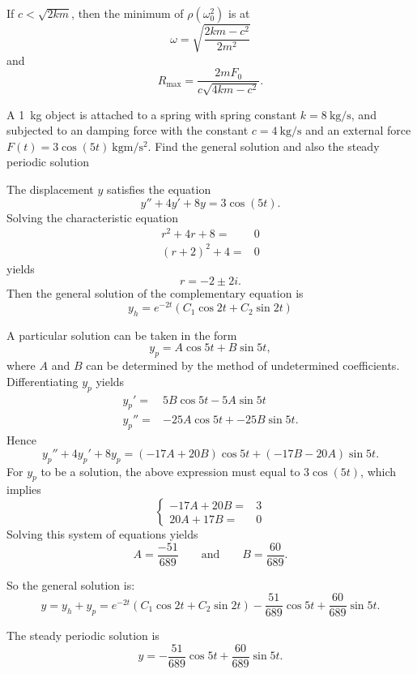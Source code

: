 If $c<\sqrt{2km}$, then the minimum of $\rho(\omega_0^2)$ is at 
\[\omega=\sqrt{\frac{2km-c^2}{2m^2}}\]
and
\[R_{\text{max}}=\frac{2mF_0}{c\sqrt{4km-c^2}}.\]


\begin{example} 
  A \SI{1}{\kg} object is attached to a spring with spring constant $k=\SI{8}{\kg\per\second}$, and subjected to an damping force with the constant $c=\SI{4}{\kg\per\second}$ and an external force $F(t)= 3 \cos (5t)~\si{\kg\meter\per\square\second}$. Find the general solution and also the steady periodic solution
\end{example}

\begin{solution}
  The displacement $y$ satisfies the equation
  \[y''+ 4y'+8y = 3\cos(5t).\]
 Solving the characteristic equation 
  \[\begin{aligned}
    r^2+4r+8=&0\\
    (r+2)^2+4=&0
  \end{aligned}
  \]
  yields
  \[r=-2\pm 2i.\]
  Then the general solution of the complementary equation is 
  \[y_h = e^{-2t} (C_1 \cos 2t + C_2 \sin 2t)\]
  
A particular solution can be taken in the form
  \[y_p = A\cos 5t + B\sin 5t,\]
  where $A$ and $B$ can be determined by the method of undetermined coefficients.
Differentiating $y_p$ yields
\[
\begin{aligned}
  y_p'=&5B\cos 5t -5A\sin 5t\\
  y_p'' =& -25A\cos 5t + -25B\sin 5t.
\end{aligned}
\]
Hence 
\[y_p''+ 4y_p'+8y_p = (-17A+20B)\cos 5t + (-17B-20A)\sin 5t.\]
For $y_p$ to be a solution, the above expression must equal to $3\cos(5t)$, which implies
  \[
    \left\{
  \begin{aligned}
    -17A+20B =& 3\\20A+17B=&0
  \end{aligned}\right.
  \]
Solving this system of equations yields
\[A= \frac{-51}{689}\qquad\text{and}\qquad B=\frac{60}{689}.\]

So the general solution is:
\[y = y_h + y_p = e^{-2t} (C_1 \cos 2t + C_2 \sin 2t) - \frac{51}{689}\cos 5t + \frac{60}{689}\sin 5t.\]

The steady periodic solution is
\[y=- \frac{51}{689}\cos 5t + \frac{60}{689}\sin 5t.\]

\end{solution}




